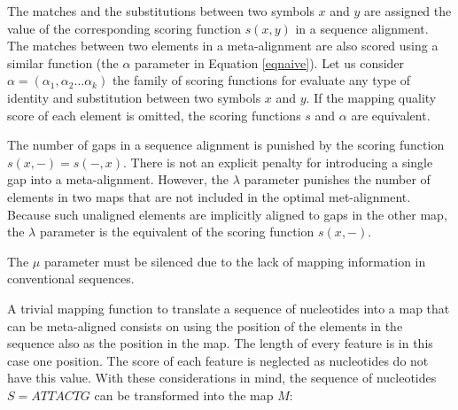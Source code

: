 \begin{menumerate}
\item
The matches and the substitutions between two symbols $x$ and $y$ are assigned the value 
of the corresponding scoring function $s(x,y)$ in a sequence alignment. The matches between
two elements in a meta-alignment are also scored using a similar function (the $\alpha$ 
parameter in Equation \ref{eqnaive}). Let us consider $\alpha=(\alpha_1,\alpha_2 \ldots \alpha_k)$
the family of scoring functions for evaluate any type of identity and substitution between two
symbols $x$ and $y$. If the mapping quality score of each element is omitted, the scoring functions 
$s$ and $\alpha$ are equivalent.
\item
The number of gaps in a sequence alignment is punished by the scoring function $s(x,-)=s(-,x)$. 
There is not an explicit penalty for introducing a single gap into a meta-alignment. However, 
the $\lambda$ parameter punishes the number of elements in two maps that are not included
in the optimal met-alignment. Because such unaligned elements are implicitly aligned to gaps in 
the other map, the $\lambda$ parameter is the equivalent of the scoring function $s(x,-)$.
\item
The $\mu$ parameter must be silenced due to the lack of mapping information in conventional sequences. 
\end{menumerate}

A trivial mapping function to translate a sequence of nucleotides into a map that can be meta-aligned
consists on using the position of the elements in the sequence also as the position in the map. 
The length of every feature is in this case one position. The score of each feature is neglected
as nucleotides do not have this value. With these considerations in mind, the sequence of nucleotides 
$S=ATTACTG$ can be transformed into the map $M$:

\begin{center}
\end{center}

